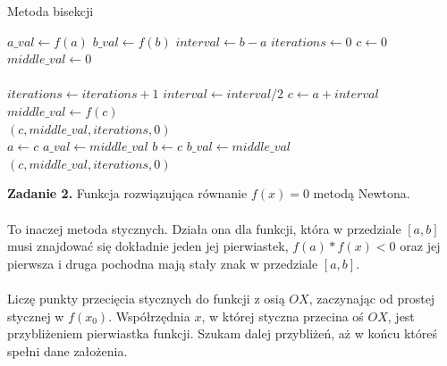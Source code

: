 \documentclass[15pt, a4paper]{article}
\begin{document}
\begin{algorithm}
\caption{Metoda bisekcji}
\label{alg:metoda_bisekcji}
\begin{algorithmic}[1]
    \State $a\_val \gets f(a)$
    \State $b\_val \gets f(b)$
    \State $interval \gets b - a$
    \State $iterations \gets 0$
    \State $c \gets 0$
    \State $middle\_val \gets 0$\\

        \State \Return {}
    \EndIf\\

        \State $iterations \gets iterations + 1$
        \State $interval \gets interval / 2$
        \State $c \gets a + interval$
        \State $middle\_val \gets f(c)$\\

            \State \Return $(c, middle\_val, iterations, 0)$
        \EndIf\\

            \State $a \gets c$
            \State $a\_val \gets middle\_val$
        \Else
            \State $b \gets c$
            \State $b\_val \gets middle\_val$
        \EndIf
    \EndWhile\\

    \State \Return $(c, middle\_val, iterations, 0)$\\
\EndFunction
\end{algorithmic}
\end{algorithm}



\vspace{0.5cm}

\noindent\hrulefill

\vspace{0.5cm}


\noindent\textbf{Zadanie 2.} Funkcja rozwiązująca równanie \( f(x) = 0 \) metodą Newtona.\\\\
\noindent To inaczej metoda stycznych. Działa ona dla funkcji, która w przedziale \([a, b]\) musi znajdować się dokładnie jeden jej pierwiastek,  \(f(a) * f(x) < 0 \) oraz jej pierwsza i druga pochodna mają stały znak w przedziale \( [a, b] \).\\\\
\noindent Liczę punkty przecięcia stycznych do funkcji z osią \( OX \), zaczynając od prostej stycznej w \( f(x_0) \). Współrzędnia \(x\), w której styczna przecina oś \(OX\), jest przybliżeniem pierwiastka funkcji. Szukam dalej przybliżeń, aż w końcu któreś spełni dane założenia. 
\end{document}
